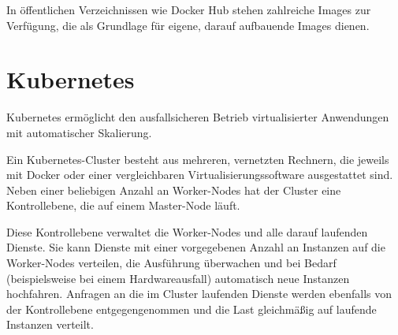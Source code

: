 In öffentlichen Verzeichnissen wie Docker Hub stehen zahlreiche Images zur Verfügung, die als Grundlage für eigene, darauf aufbauende Images dienen.

\section{Kubernetes}\label{sec:kubernetes}

Kubernetes ermöglicht den ausfallsicheren Betrieb virtualisierter Anwendungen mit automatischer Skalierung.

Ein Kubernetes-Cluster besteht aus mehreren, vernetzten Rechnern, die jeweils mit Docker oder einer vergleichbaren Virtualisierungssoftware ausgestattet sind.
Neben einer beliebigen Anzahl an Worker-Nodes hat der Cluster eine Kontrollebene, die auf einem Master-Node läuft.

Diese Kontrollebene verwaltet die Worker-Nodes und alle darauf laufenden Dienste.
Sie kann Dienste mit einer vorgegebenen Anzahl an Instanzen auf die Worker-Nodes verteilen, die Ausführung überwachen und bei Bedarf (beispielsweise bei einem Hardwareausfall) automatisch neue Instanzen hochfahren.
Anfragen an die im Cluster laufenden Dienste werden ebenfalls von der Kontrollebene entgegengenommen und die Last gleichmäßig auf laufende Instanzen verteilt.
